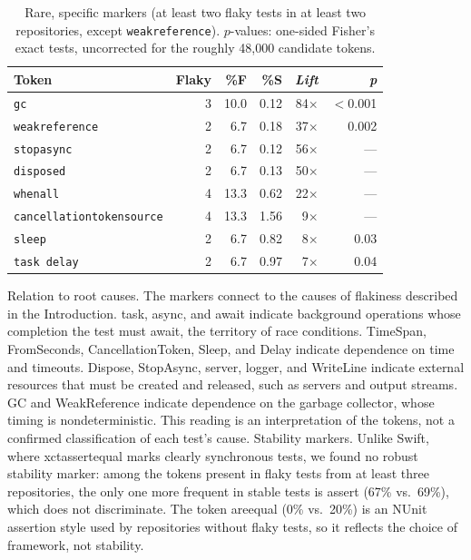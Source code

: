 \begin{table}[!h]
\caption{Rare, specific markers (at least two flaky tests in at least two repositories, except \texttt{weakreference}). $p$-values: one-sided Fisher's exact tests, uncorrected for the roughly 48,000 candidate tokens.}
\label{tab:marcadores}
\centering
\scriptsize
\setlength{\tabcolsep}{5pt}
\begin{tabular}{@{}lrrrrr@{}}
\hline\hline
\textbf{Token} & \textbf{Flaky} & \textbf{\%F} & \textbf{\%S} & \textbf{\emph{Lift}} & \textbf{\emph{p}} \\
\hline
\texttt{gc}                      & 3 & 10.0 & 0.12 & 84$\times$ & $<$0.001 \\
\texttt{weakreference}           & 2 &  6.7 & 0.18 & 37$\times$ & 0.002 \\
\texttt{stopasync}               & 2 &  6.7 & 0.12 & 56$\times$ & --- \\
\texttt{disposed}                & 2 &  6.7 & 0.13 & 50$\times$ & --- \\
\texttt{whenall}                 & 4 & 13.3 & 0.62 & 22$\times$ & --- \\
\texttt{cancellationtokensource} & 4 & 13.3 & 1.56 &  9$\times$ & --- \\
\texttt{sleep}                   & 2 &  6.7 & 0.82 &  8$\times$ & 0.03 \\
\texttt{task delay}              & 2 &  6.7 & 0.97 &  7$\times$ & 0.04 \\
\hline\hline
\end{tabular}
\end{table}

Relation to root causes. The markers connect to the causes of flakiness described in the Introduction. task, async, and await indicate background operations whose completion the test must await, the territory of race conditions. TimeSpan, FromSeconds, CancellationToken, Sleep, and Delay indicate dependence on time and timeouts. Dispose, StopAsync, server, logger, and WriteLine indicate external resources that must be created and released, such as servers and output streams. GC and WeakReference indicate dependence on the garbage collector, whose timing is nondeterministic. This reading is an interpretation of the tokens, not a confirmed classification of each test's cause.
Stability markers. Unlike Swift, where xctassertequal marks clearly synchronous tests, we found no robust stability marker: among the tokens present in flaky tests from at least three repositories, the only one more frequent in stable tests is assert (67\% vs.\ 69\%), which does not discriminate. The token areequal (0\% vs.\ 20\%) is an NUnit assertion style used by repositories without flaky tests, so it reflects the choice of framework, not stability.

